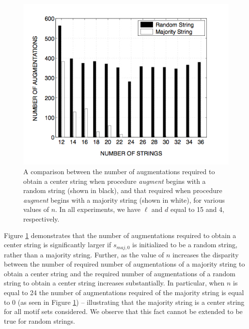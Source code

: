 \begin{figure}[h!]
\centering
\includegraphics[width=\linewidth]{images/maj_vs_rand}%
 \caption[A comparison between the number of augmentations required to obtain a center string when procedure {\em augment} begins with a random string, and that required when procedure {\em augment} begins with a majority string, for various values of $n$.]{A comparison between the number of augmentations required to obtain a center string when procedure {\em augment} begins with a random string (shown in black), and that required when procedure {\em augment} begins with a majority string (shown in white), for various values of $n$. In all experiments, we have $\ell$ and $d$ equal to 15 and 4, respectively.}
\label{maj_vs_rand_fig}
\end{figure}

Figure \ref{maj_vs_rand_fig} demonstrates that the number of augmentations required to obtain a center string is significantly larger if $s_{maj, 0}$ is initialized to be a random string, rather than a majority string. Further, as the value of $n$ increases the disparity between the number of required number of augmentations of a majority string to obtain a center string and the required number of augmentations of a random string to obtain a center string increases substantially.  In particular, when $n$ is equal to 24 the number of augmentations required of the majority string is equal to 0 (as seen in Figure \ref{maj_vs_rand_fig}) -- illustrating that the majority string is a center string for all motif sets considered.  We observe that this fact cannot be extended to be true for random strings.
 

